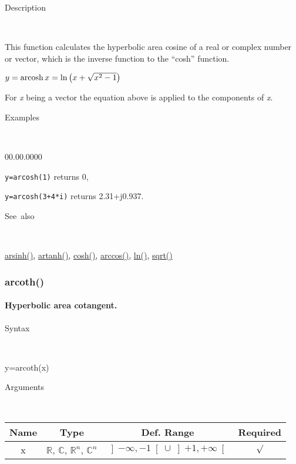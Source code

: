 \begin{description}
\item [Description]~
\end{description}
This function calculates the hyperbolic area cosine of a real or complex
number or vector, which is the inverse function to the {}``cosh''
function.

\medskip{}
$y=\textrm{arcosh\,}x=\ln\left(x+\sqrt{x^{2}-1}\right)$ 
\medskip{}

\noindent For \textit{x} being a vector the equation above is applied
to the components of \textit{x}.

\begin{description}
\item [Examples]~
\end{description}
\begin{lyxlist}{00.00.0000}
\item [\texttt{y=arcosh(1)}]returns 0,
\item [\texttt{y=arcosh(3+4{*}i)}]returns 2.31+j0.937.
\end{lyxlist}
\begin{description}
\item [See~also]~
\end{description}
\textcolor{blue}{\hyperlink{arsinh}{arsinh()}}\textcolor{black}{,}
\textcolor{blue}{\hyperlink{artanh}{artanh()}}\textcolor{black}{,}
\textcolor{blue}{\hyperlink{cosh}{cosh()}}\textcolor{black}{,} \textcolor{blue}{\hyperlink{arccos}{arccos()}}\textcolor{black}{,}
\textcolor{blue}{\hyperlink{ln}{ln()}}\textcolor{black}{,} \textcolor{blue}{\hyperlink{sqrt}{sqrt()}}


\newpage
\subsubsection*{\hypertarget{arcoth}{}{\Large arcoth()}}


\paragraph{\label{par:Hyperbolic-area-cotangent}Hyperbolic area cotangent.}

\begin{description}
\item [Syntax]~
\end{description}
y=arcoth(x)

\begin{description}
\item [Arguments]~
\end{description}
\begin{tabular}{|c|c|c|c|}
\hline 
Name&
Type&
Def. Range&
Required\tabularnewline
\hline
\hline 
x&
$\mathbb{R}$, $\mathbb{C}$, $\mathbb{R}^{n}$, $\mathbb{C}^{n}$&
$\left]-\infty,-1\right[\cup\left]+1,+\infty\right[$&
$\surd$\tabularnewline
\hline
\end{tabular}

